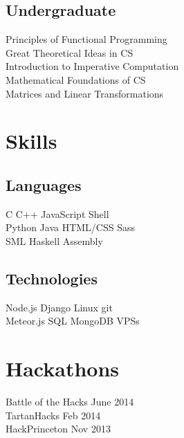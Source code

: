 \documentclass[]{deedy-resume-openfont}
\begin{document}
\begin{minipage}[t]{0.33\textwidth}
\subsection{Undergraduate}
Principles of Functional Programming \\
Great Theoretical Ideas in CS \\
Introduction to Imperative Computation \\
Mathematical Foundations of CS \\
Matrices and Linear Transformations \\
\sectionsep


\section{Skills}
\subsection{Languages}
C \textbullet{} C++ \textbullet{} JavaScript \textbullet{} Shell \\
Python \textbullet{} Java \textbullet{} HTML/CSS \textbullet{} Sass \\
SML \textbullet{} Haskell \textbullet{} Assembly \\
\sectionsep

\subsection{Technologies}
Node.js \textbullet{} Django \textbullet Linux \textbullet{} git \\
Meteor.js \textbullet{} SQL \textbullet{} MongoDB \textbullet{} VPSs
\sectionsep


\section{Hackathons} 
Battle of the Hacks \textbullet{} June 2014 \\
TartanHacks \textbullet{} Feb 2014 \\
HackPrinceton \textbullet{} Nov 2013 \\
\sectionsep

%
%

\end{minipage} 
\end{document}
